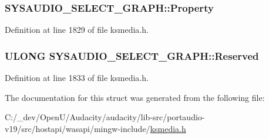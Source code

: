 \subsubsection[{\texorpdfstring{Property}{Property}}]{ S\+Y\+S\+A\+U\+D\+I\+O\+\_\+\+S\+E\+L\+E\+C\+T\+\_\+\+G\+R\+A\+P\+H\+::\+Property}\hypertarget{struct_s_y_s_a_u_d_i_o___s_e_l_e_c_t___g_r_a_p_h_a0586ee0a0cc7628dbf30915ad53eab50}{}\label{struct_s_y_s_a_u_d_i_o___s_e_l_e_c_t___g_r_a_p_h_a0586ee0a0cc7628dbf30915ad53eab50}


Definition at line 1829 of file ksmedia.\+h.

\subsubsection[{\texorpdfstring{Reserved}{Reserved}}]{\setlength{\rightskip}{0pt plus 5cm}U\+L\+O\+NG S\+Y\+S\+A\+U\+D\+I\+O\+\_\+\+S\+E\+L\+E\+C\+T\+\_\+\+G\+R\+A\+P\+H\+::\+Reserved}\hypertarget{struct_s_y_s_a_u_d_i_o___s_e_l_e_c_t___g_r_a_p_h_a6812370b5f37ef5eaff3f915e53afa0e}{}\label{struct_s_y_s_a_u_d_i_o___s_e_l_e_c_t___g_r_a_p_h_a6812370b5f37ef5eaff3f915e53afa0e}


Definition at line 1833 of file ksmedia.\+h.



The documentation for this struct was generated from the following file\+:\begin{DoxyCompactItemize}
\item 
C\+:/\+\_\+dev/\+Open\+U/\+Audacity/audacity/lib-\/src/portaudio-\/v19/src/hostapi/wasapi/mingw-\/include/\hyperlink{ksmedia_8h}{ksmedia.\+h}\end{DoxyCompactItemize}
